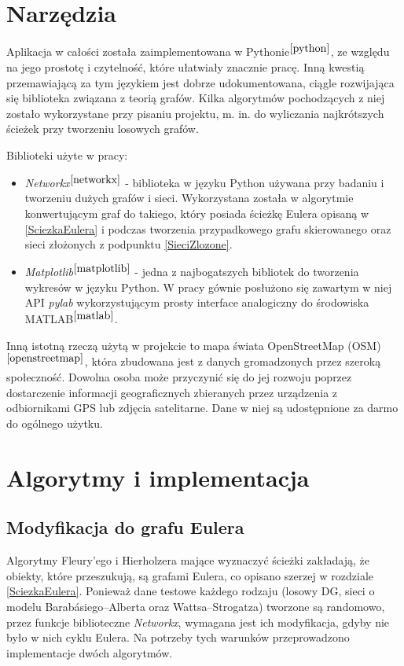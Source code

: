 \documentclass[a4paper, 12pt, twoside, openright]{article}
\begin{document}
\newpage
\section{Narzędzia} \label{narzedzia}

\indent\par
	Aplikacja w całości została zaimplementowana w Pythonie$^{\cite{python}}$, ze względu na jego prostotę i czytelność, które ułatwiały znacznie pracę. Inną kwestią przemawiającą za tym językiem jest dobrze udokumentowana, ciągle rozwijająca się biblioteka związana z teorią grafów. Kilka algorytmów pochodzących z niej zostało wykorzystane przy pisaniu projektu, m. in. do wyliczania najkrótszych ścieżek przy tworzeniu losowych grafów.

	Biblioteki użyte w pracy:
	\begin{itemize}
		\item \textit{Networkx}$^{\cite{networkx}}$ - biblioteka w języku Python używana przy badaniu i tworzeniu dużych grafów i sieci. Wykorzystana została w algorytmie konwertującym graf do takiego, który posiada ścieżkę Eulera opisaną w \ref{SciezkaEulera} i podczas tworzenia przypadkowego grafu skierowanego oraz sieci złożonych z podpunktu \ref{SieciZlozone}.
		\item \textit{Matplotlib}$^{\cite{matplotlib}}$ - jedna z najbogatszych bibliotek do tworzenia wykresów w języku Python. W pracy gównie posłużono się zawartym w niej API \textit{pylab} wykorzystującym prosty interface analogiczny do środowiska MATLAB$^{\cite{matlab}}$.
	\end{itemize}

	Inną istotną rzeczą użytą w projekcie to mapa świata OpenStreetMap (OSM)$^{\cite{openstreetmap}}$, która zbudowana jest z danych gromadzonych przez szeroką społeczność. Dowolna osoba może przyczynić się do jej rozwoju poprzez dostarczenie informacji geograficznych zbieranych przez urządzenia z odbiornikami GPS lub zdjęcia satelitarne. Dane w niej są udostępnione za darmo do ogólnego użytku.




\newpage
\section{Algorytmy i implementacja}

\subsection{Modyfikacja do grafu Eulera} \label{modyfikacja}
\indent\par
	Algorytmy Fleury’ego i Hierholzera mające wyznaczyć ścieżki zakładają, że obiekty, które przeszukują, są grafami Eulera, co opisano szerzej w rozdziale \ref{SciezkaEulera}. Ponieważ dane testowe każdego rodzaju (losowy DG, sieci o modelu Barabásiego–Alberta oraz Wattsa–Strogatza) tworzone są randomowo, przez funkcje biblioteczne \textit{Networkx}, wymagana jest ich modyfikacja, gdyby nie było w nich cyklu Eulera. Na potrzeby tych warunków przeprowadzono implementacje dwóch algorytmów. 
	
\end{document}
